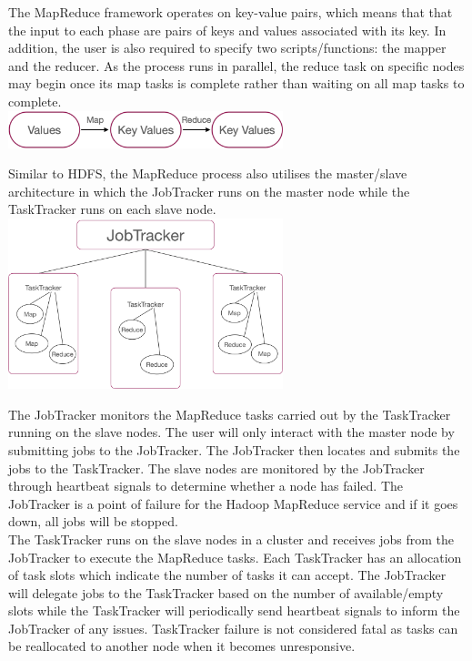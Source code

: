 \documentclass[11pt]{book}
\begin{document}
The MapReduce framework operates on key-value pairs, which means that that the input to each phase are pairs of keys and values associated with its key. In addition, the user is also required to specify two scripts/functions: the mapper and the reducer. As the process runs in parallel, the reduce task on specific nodes may begin once its map tasks is complete rather than waiting on all map tasks to complete. \\

\includegraphics[width=8cm]{keyvalue}

Similar to HDFS, the MapReduce process also utilises the master/slave architecture in which the JobTracker runs on the master node while the TaskTracker runs on each slave node. \\

\includegraphics[width=8cm]{jobtracker}

The JobTracker monitors the MapReduce tasks carried out by the TaskTracker running on the slave nodes. The user will only interact with the master node by submitting jobs to the JobTracker. The JobTracker then locates and submits the jobs to the TaskTracker. The slave nodes are monitored by the JobTracker through heartbeat signals to determine whether a node has failed. The JobTracker is a point of failure for the Hadoop MapReduce service and if it goes down, all jobs will be stopped. \\

The TaskTracker runs on the slave nodes in a cluster and receives jobs from the JobTracker to execute the MapReduce tasks. Each TaskTracker has an allocation of task slots which indicate the number of tasks it can accept. The JobTracker will delegate jobs to the TaskTracker based on the number of available/empty slots while the TaskTracker will periodically send heartbeat signals to inform the JobTracker of any issues. TaskTracker failure is not considered fatal as tasks can be reallocated to another node when it becomes unresponsive.\\
\end{document}

